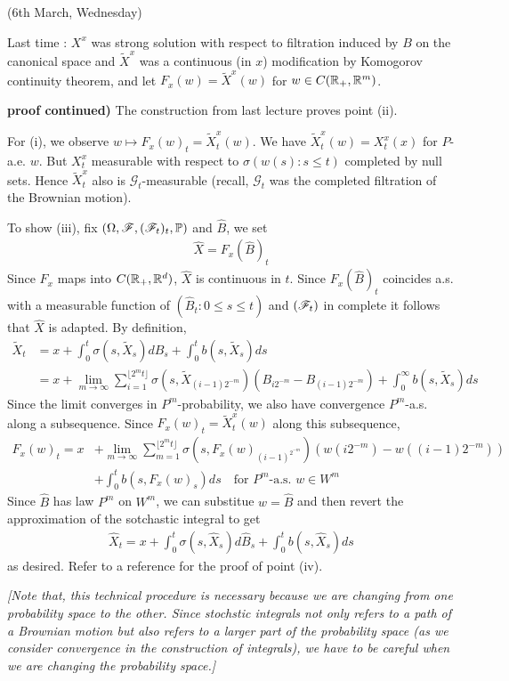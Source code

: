 \documentclass[12pt,a4paper]{article}
\newenvironment{proof}
{\begin{changemargin}{0.5cm}{0.5cm} 
	}%
	{\end{changemargin}
}
\newenvironment{p}
{\begin{proof} 
	}%
	{\end{proof}
}
\begin{document}
\newday

(6th March, Wednesday)
\s

Last time : $X^x$ was strong solution with respect to filtration induced by $B$ on the canonical space and $\tilde{X}^x$ was a continuous (in $x$) modification by Komogorov continuity theorem, and let $F_x(w) = \tilde{X}^x(w)$ for $w\in C(\mathbb{R}_+, \mathbb{R}^m)$.
\s

\begin{p}
\textbf{proof continued)} The construction from last lecture proves point (ii). 

\quad For (i), we observe $w\mapsto F_x(w)_t =\tilde{X}_t^x(w)$. We have $\tilde{X}^x_t(w) = X_t^x(x)$ for $P$-a.e. $w$. But $X_t^x$ measurable with respect to $\sigma(w(s) : s\leq t)$ completed by null sets. Hence $\tilde{X}_t^x$ also is $\mathscr{G}_t$-measurable (recall, $\mathscr{G}_t$ was the completed filtration of the Brownian motion).

\quad To show (iii), fix $(\Omega, \mathscr{F}, (\mathscr{F}_t)_t, \mathbb{P})$ and $\hat{B}$, we set
\begin{align*}
\hat{X} = F_x (\hat{B})_t
\end{align*}
Since $F_x$ maps into $C(\mathbb{R}_+, \mathbb{R}^d)$, $\hat{X}$ is continuous in $t$. Since ${F}_x(\hat{B})_t$ coincides a.s. with a measurable function of $(\hat{B}_t:0\leq s\leq t)$ and $(\mathscr{F}_t)$ in complete it follows that $\hat{X}$ is adapted. By definition, 
\begin{align*}
\tilde{X}_t &= x + \int_0^t \sigma(s, \tilde{X}_s) dB_s + \int_0^t b(s, \tilde{X}_s) ds \\
&= x+ \lim_{m\rightarrow \infty} \sum_{i=1}^{\lfloor 2^m t\rfloor} \sigma(s, \tilde{X}_{(i-1)2^{-m}})(B_{i2^{-m}} - B_{(i-1)2^{-m}}) +\int_0^{\infty} b(s, \tilde{X}_s) ds
\end{align*}
Since the limit converges in $P^m$-probability, we also have convergence $P^m$-a.s. along a subsequence. Since $F_x(w)_t = \tilde{X}_t^x (w)$ along this subsequence,
\begin{align*}
F_x(w)_t = x &+ \lim_{m\rightarrow \infty} \sum_{m=1}^{\lfloor 2^m t\rfloor} \sigma(s, F_x(w)_{(i-1)^{2^{-m}}})(w(i2^{-m}) - w((i-1)2^{-m})) \\
& + \int_0^t b(s, F_x(w)_s) ds \quad \text{for } P^m\text{-a.s. }w\in W^m
\end{align*}
Since $\hat{B}$ has law $P^m$ on $W^m$, we can substitue $w= \hat{B}$ and then revert the approximation of the sotchastic integral to get
\begin{align*}
\hat{X}_t =x + \int_0^t \sigma(s, \hat{X}_s) d\hat{B}_s + \int_0^t b(s, \hat{X}_s) ds
\end{align*}
as desired.
\quad Refer to a reference for the proof of point (iv).

\eop

\emph{[Note that, this technical procedure is necessary because we are changing from one probability space to the other. Since stochstic integrals not only refers to a path of a Brownian motion but also refers to a larger part of the probability space (as we consider convergence in the construction of integrals), we have to be careful when we are changing the probability space.]}
\end{p}
\s
\end{document}
